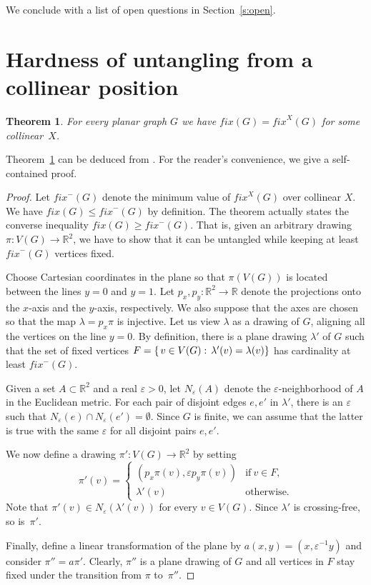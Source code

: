 \documentclass[reqno,12pt]{amsart}
\newtheorem{theorem}{Theorem}[section]
\newcommand{\fix}[1]{\mathit{fix}(#1)}
\newcommand{\reals}{\mathbb{R}}
\newcommand{\function}[2]{:#1 \rightarrow #2}
\newcommand{\setdef}[2]{\left\{ \hspace{0.5mm} #1 : \hspace{0.5mm} #2 \right\}}
\newcommand{\eps}{\varepsilon}
\newcommand{\fixx}[1]{\mathit{fix}^X(#1)}
\newcommand{\fixl}[1]{\mathit{fix}^-(#1)}
\begin{document}
We conclude with a list of open questions in Section~\ref{s:open}. 


\section{Hardness of untangling from a collinear position}\label{s:collin}


\begin{theorem}\label{thm:fixlfix}
For every planar graph $G$ we have $\fix G=\fixx G$ for some collinear~$X$.
\end{theorem}
Theorem~\ref{thm:fixlfix} can
be deduced from \cite[Lemma 1]{Bose}. For the reader's convenience,
we give a self-contained proof.

\begin{proof} 
Let $\fixl G$ denote the minimum value of $\fixx G$ over collinear $X$.
We have $\fix G\le\fixl G$ by definition.
The theorem actually states the converse inequality $\fix G\ge\fixl G$.
That is, given an arbitrary drawing $\pi\function{V(G)}{\reals^2}$, we have to
show that it can be untangled while keeping at least $\fixl G$ vertices fixed.

Choose Cartesian coordinates in the plane so that $\pi(V(G))$ is located between
the lines $y=0$ and $y=1$. Let $p_x,p_y:\reals^2\to\reals$ denote the projections 
onto the $x$-axis and the $y$-axis, respectively. We also suppose that the axes
are chosen so that the map $\lambda=p_x\pi$ is injective. 
Let us view $\lambda$ as a drawing of $G$, aligning all the vertices on the line $y=0$.
By definition, there is a plane drawing $\lambda'$ of $G$ such that 
the set of fixed vertices $F=\setdef{v\in V(G)}{\lambda'(v)=\lambda(v)}$
has cardinality at least $\fixl G$. 

Given a set $A\subset\reals^2$ and a real $\eps>0$, let $N_\eps(A)$
denote the $\eps$-neighborhood of $A$ in the Euclidean metric. 
For each pair of disjoint edges $e, e'$
in $\lambda'$, there is an $\eps$ such that $N_\eps(e)\cap N_\eps(e')=\emptyset$.
Since $G$ is finite, we can assume that the latter is true with the same
$\eps$ for all disjoint pairs $e, e'$. 

We now define a drawing $\pi'\function{V(G)}{\reals^2}$
by setting
$$\pi'(v)=
\begin{cases}
(p_x\pi(v),\eps p_y\pi(v)) & \mathrm{if}\ v\in F,\\
\lambda'(v) & \mathrm{otherwise}.
\end{cases}
$$
Note that $\pi'(v)\in N_\eps(\lambda'(v))$ for every $v\in V(G)$.
Since $\lambda'$ is crossing-free, so is~$\pi'$.

Finally, define a linear transformation of the plane by $a(x,y)=(x,\eps^{-1}y)$
and consider $\pi''=a\pi'$. Clearly, $\pi''$ is a plane drawing of $G$ and all
vertices in $F$ stay fixed under the transition from $\pi$ to~$\pi''$.
\end{proof}
\end{document}
